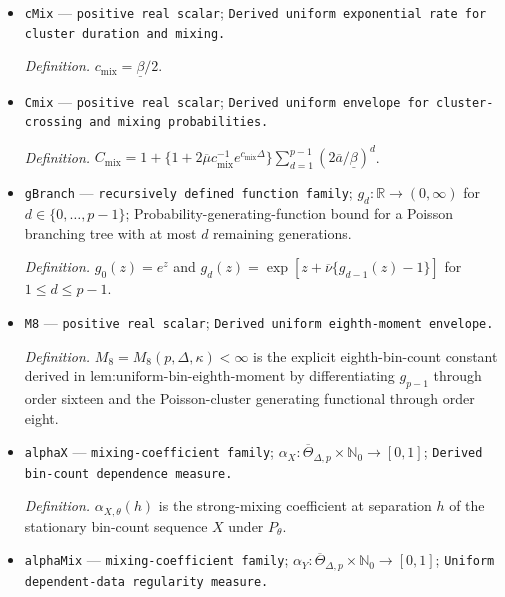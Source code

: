 \documentclass{article}
\begin{document}
\begin{itemize}
  \par\smallskip\noindent\emph{Definition.} \(D_{\mathrm{cl}}\) is the elapsed time from a Hawkes immigrant to the latest event in its Poisson immigration--birth cluster, with value zero for an immigrant having no descendants.
  \item \texttt{cMix} --- \texttt{positive real scalar}; \texttt{Derived uniform exponential rate for cluster duration and mixing.}
  \par\smallskip\noindent\emph{Definition.} \(c_{\mathrm{mix}}=\underline\beta/2\).
  \item \texttt{Cmix} --- \texttt{positive real scalar}; \texttt{Derived uniform envelope for cluster-\allowbreak{}crossing and mixing probabilities.}
  \par\smallskip\noindent\emph{Definition.} \(C_{\mathrm{mix}}=1+\{1+2\overline\mu c_{\mathrm{mix}}^{-1}e^{c_{\mathrm{mix}}\Delta}\}\sum_{d=1}^{p-1}(2\overline a/\underline\beta)^d\).
  \item \texttt{gBranch} --- \texttt{recursively defined function family}; \(g_d:\mathbb R\to(0,\infty)\) for \(d\in\{0,\ldots,p-1\}\); Probability-generating-function bound for a Poisson branching tree with at most \(d\) remaining generations.
  \par\smallskip\noindent\emph{Definition.} \(g_0(z)=e^z\) and \(g_d(z)=\exp[z+\overline\nu\{g_{d-1}(z)-1\}]\) for \(1\leq d\leq p-1\).
  \item \texttt{M8} --- \texttt{positive real scalar}; \texttt{Derived uniform eighth-\allowbreak{}moment envelope.}
  \par\smallskip\noindent\emph{Definition.} \(M_8=M_8(p,\Delta,\kappa)<\infty\) is the explicit eighth-bin-count constant derived in \(\text{lem:uniform-bin-eighth-moment}\) by differentiating \(g_{p-1}\) through order sixteen and the Poisson-cluster generating functional through order eight.
  \item \texttt{alphaX} --- \texttt{mixing-\allowbreak{}coefficient family}; \(\alpha_X:\overline\Theta_{\Delta,p}\times\mathbb N_0\to[0,1]\); \texttt{Derived bin-\allowbreak{}count dependence measure.}
  \par\smallskip\noindent\emph{Definition.} \(\alpha_{X,\theta}(h)\) is the strong-mixing coefficient at separation \(h\) of the stationary bin-count sequence \(X\) under \(P_{\theta}\).
  \item \texttt{alphaMix} --- \texttt{mixing-\allowbreak{}coefficient family}; \(\alpha_Y:\overline\Theta_{\Delta,p}\times\mathbb N_0\to[0,1]\); \texttt{Uniform dependent-\allowbreak{}data regularity measure.}

\end{itemize}
\end{document}
